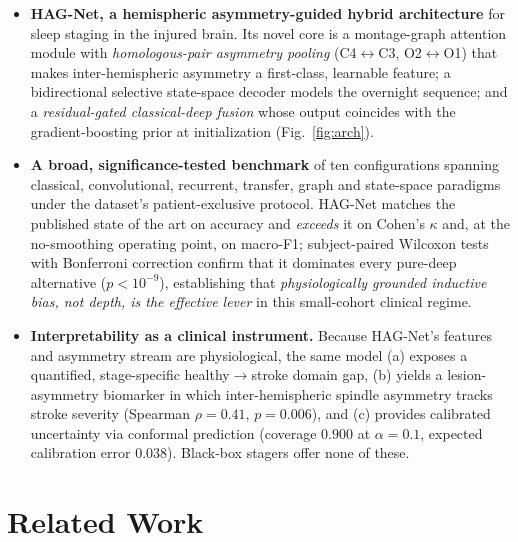 \documentclass[journal]{IEEEtran}
\begin{document}
\begin{itemize}
\item \textbf{HAG-Net, a hemispheric asymmetry-guided hybrid architecture} for
sleep staging in the injured brain. Its novel core is a montage-graph attention
module with \emph{homologous-pair asymmetry pooling} (C4$\leftrightarrow$C3,
O2$\leftrightarrow$O1) that makes inter-hemispheric asymmetry a first-class,
learnable feature; a bidirectional selective state-space decoder models the
overnight sequence; and a \emph{residual-gated classical-deep fusion} whose output
coincides with the gradient-boosting prior at initialization
(Fig.~\ref{fig:arch}).
\item \textbf{A broad, significance-tested benchmark} of ten configurations
spanning classical, convolutional, recurrent, transfer, graph and state-space
paradigms under the dataset's patient-exclusive protocol. HAG-Net matches the
published state of the art on accuracy and \emph{exceeds} it on Cohen's $\kappa$
and, at the no-smoothing operating point, on macro-F1; subject-paired Wilcoxon
tests with Bonferroni correction confirm that it dominates every pure-deep
alternative ($p<10^{-9}$), establishing that \emph{physiologically grounded
inductive bias, not depth, is the effective lever} in this small-cohort clinical
regime.
\item \textbf{Interpretability as a clinical instrument.} Because HAG-Net's
features and asymmetry stream are physiological, the same model (a) exposes a
quantified, stage-specific healthy$\rightarrow$stroke domain gap, (b) yields a
lesion-asymmetry biomarker in which inter-hemispheric spindle asymmetry tracks
stroke severity (Spearman $\rho=0.41$, $p=0.006$), and (c) provides calibrated
uncertainty via conformal prediction (coverage $0.900$ at $\alpha{=}0.1$, expected
calibration error $0.038$). Black-box stagers offer none of these.
\end{itemize}

\section{Related Work}
\label{sec:related}
\end{document}

